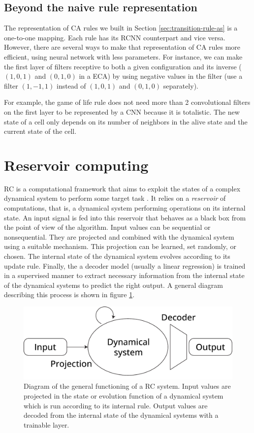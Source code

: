 \subsection{Beyond the naive rule representation}

The representation of \ac{CA} rules we built in Section
\ref{sec:transition-rule-as} is a one-to-one mapping. Each rule has its
R\ac{CNN} counterpart and vice versa. However, there are several ways to make
that representation of \ac{CA} rules more efficient, using neural network with
less parameters. For instance, we can make the first layer of filters receptive
to both a given configuration and its inverse (\eg~$(1, 0, 1)$ and $(0, 1, 0)$
in a ECA) by using negative values in the filter (use a filter $(1, -1, 1)$
instead of $(1, 0, 1)$ and $(0, 1, 0)$ separately).

For example, the game of life rule does not need more than 2 convolutional
filters on the first layer to be represented by a \ac{CNN} because it is
totalistic. The new state of a cell only depends on its number of neighbors in
the alive state and the current state of the cell.


\section{Reservoir computing \label{sec:res-models}}
\Ac{RC} is a computational framework that aims to exploit the states of a
complex dynamical system to perform some target task
\parencite{tanakaRecentAdvancesPhysical2019}. It relies on a \emph{reservoir} of
computations, that is, a dynamical system performing operations on its internal
state. An input signal is fed into this reservoir that behaves as a black box
from the point of view of the algorithm. Input values can be sequential or
nonsequential. They are projected and combined with the dynamical system using
a suitable mechanism. This projection can be learned, set randomly, or chosen.
The internal state of the dynamical system evolves according to its update
rule. Finally, the a decoder model (usually a linear regression) is trained in a
supervised manner to extract necessary information from the internal state of
the dynamical systems to predict the right output. A general diagram describing
this process is shown in figure \ref{fig:reservoir_diagram}.

\begin{figure}[htbp]
  \centering
  \includegraphics[width=.8\linewidth]{figures/reservoir_schema}
  \caption{Diagram of the general functioning of a \ac{RC} system. Input values
    are projected in the state or evolution function of a dynamical system which
    is run according to its internal rule. Output values are decoded from the
    internal state of the dynamical systems with a trainable layer.}
  \label{fig:reservoir_diagram}
\end{figure}

